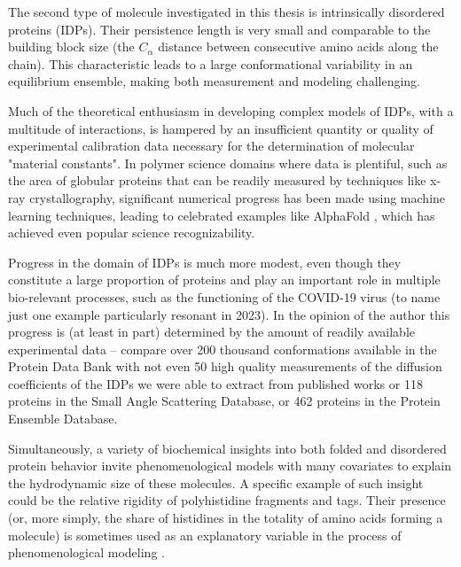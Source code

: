 \documentclass{doctoral}
\begin{document}
The second type of molecule investigated in this thesis is intrinsically disordered proteins (IDPs).
Their persistence length is very small and comparable to the building block size (the $C_\alpha$ distance between consecutive amino acids along the chain).
This characteristic leads to a large conformational variability in an equilibrium ensemble, making both measurement and modeling challenging.

Much of the theoretical enthusiasm in developing complex models of IDPs, with a multitude of interactions, is hampered by an insufficient quantity or quality of experimental calibration data necessary for the determination of molecular "material constants".
In polymer science domains where data is plentiful, such as the area of globular proteins that can be readily measured by techniques like x-ray crystallography, significant numerical progress has been made using machine learning techniques, leading to celebrated examples like AlphaFold \cite{Jumper_2021}, which has achieved even popular science recognizability.

Progress in the domain of IDPs is much more modest, even though they constitute a large proportion of proteins\cite{Ward_2004} and play an important role in multiple bio-relevant processes, such as the functioning of the COVID-19 virus\cite{Rozycki_2022} (to name just one example particularly resonant in 2023).
In the opinion of the author this progress is (at least in part) determined by the amount of readily available experimental data -- compare over 200 thousand conformations available in the Protein Data Bank\cite{rcsb_org} with not even 50 high quality measurements of the diffusion coefficients of the IDPs we were able to extract from published works\cite{Waszkiewicz_2024_mda} or 118 proteins in the Small Angle Scattering Database\cite{sasdb_org}, or 462 proteins in the Protein Ensemble Database\cite{proteinensemble_org}.

Simultaneously, a variety of biochemical insights into both folded and disordered protein behavior invite phenomenological models with many covariates to explain the hydrodynamic size of these molecules.
A specific example of such insight could be the relative rigidity of polyhistidine fragments and tags.
Their presence (or, more simply, the share of histidines in the totality of amino acids forming a molecule) is sometimes used as an explanatory variable in the process of phenomenological modeling \cite{Tomasso_2016, Marsh_2010}.
\end{document}
